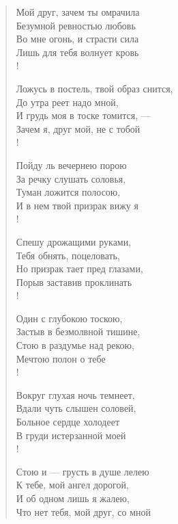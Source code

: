 \begin{verse}
\begin{altverse}
Мой друг, зачем ты омрачила\\
     Безумной ревностью любовь\ldotsq\\
Во мне огонь, и страсти сила\\
     Лишь для тебя волнует кровь\ldotst\\!

Ложусь в постель, твой образ снится,\\
     До утра реет надо мной,\\
И грудь моя в тоске томится, ---\\
     Зачем я, друг мой, не с тобой\ldotst\\!

Пойду ль вечернею порою\\
      За речку слушать соловья,\\
Туман ложится полосою,\\
      И в нем твой призрак вижу я\ldotst\\!

Спешу дрожащими руками,\\
    Тебя обнять, поцеловать,\\
Но призрак тает пред глазами,\\
      Порыв заставив проклинать\ldotst\\!

Один с глубокою  тоскою,\\
     Застыв в безмолвной тишине,\\
Стою в раздумье над рекою,\\
     Мечтою полон о тебе\ldotst\\!

Вокруг глухая ночь темнеет,\\
       Вдали чуть слышен соловей,\\
Больное сердце холодеет\\
        В груди истерзанной моей\ldotst\\!

Стою и --- грусть в душе лелею\\
     К тебе, мой ангел дорогой,\\
И об одном лишь я жалею,\\
  Что нет тебя, мой друг, со мной\ldotst
\end{altverse}
\end{verse}

\newpage
\vspace*{0cm}



